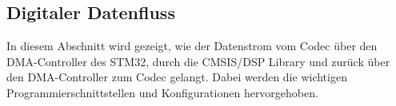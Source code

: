 \subsection{Digitaler Datenfluss}
\label{sec:DSPKonzept}

In diesem Abschnitt wird gezeigt, wie der Datenstrom vom Codec über den DMA-Controller des STM32,
durch die CMSIS/DSP Library und zurück über den DMA-Controller zum Codec gelangt.
Dabei werden die wichtigen Programmierschnittstellen und Konfigurationen hervorgehoben.






